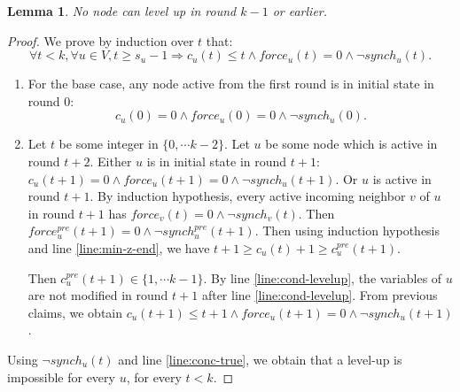\documentclass[11pt,letterpaper]{article}
\newtheorem{lem}[thm]{Lemma}
\begin{document}
\begin{lem} \label{lem:early-phase}
	No node can level up in round $k-1$ or earlier.
\end{lem}
\begin{proof}
	We prove by induction over $t$ that:
	$$\forall t < k, \forall u \in V, t \geq s_u-1 \Rightarrow c_u(t) \leq t \wedge force_u(t) = 0 \wedge \neg synch_u(t).$$
	\begin{enumerate}
		\item For the base case, any node active from the first round is in initial state in round 0:
			$$c_u(0) = 0 \wedge force_u(0) = 0 \wedge \neg synch_u(0).$$
		\item Let $t$ be some integer in $\{0, \cdots k-2\}$. Let $u$ be some node which is active in round $t+2$.
			Either $u$ is in initial state in round $t+1$: $c_u(t+1) = 0 \wedge force_u(t+1) = 0 \wedge \neg synch_u(t+1)$.
			Or $u$ is active in round $t+1$.
			By induction hypothesis, every active incoming neighbor $v$ of $u$ in round $t+1$ has $force_v(t) = 0 \wedge \neg synch_v(t)$.
			Then $force_u^{pre}(t+1) = 0 \wedge \neg synch_u^{pre}(t+1)$.
			Then using induction hypothesis and line \ref{line:min-z-end}, we have
			$t+1 \geq c_u(t)+1 \geq c_u^{pre}(t+1)$.

			Then $c_u^{pre}(t+1) \in \{1, \cdots k-1\}$.
			By line \ref{line:cond-levelup}, the variables of $u$ are not modified in round $t+1$ after line \ref{line:cond-levelup}.
			From previous claims, we obtain $c_u(t+1) \leq t+1 \wedge force_u(t+1) = 0 \wedge \neg synch_u(t+1)$.
	\end{enumerate}
	Using $\neg synch_u(t)$ and line \ref{line:conc-true}, we obtain that a level-up is impossible for every $u$, for every $t < k$.
\end{proof}
\end{document}
